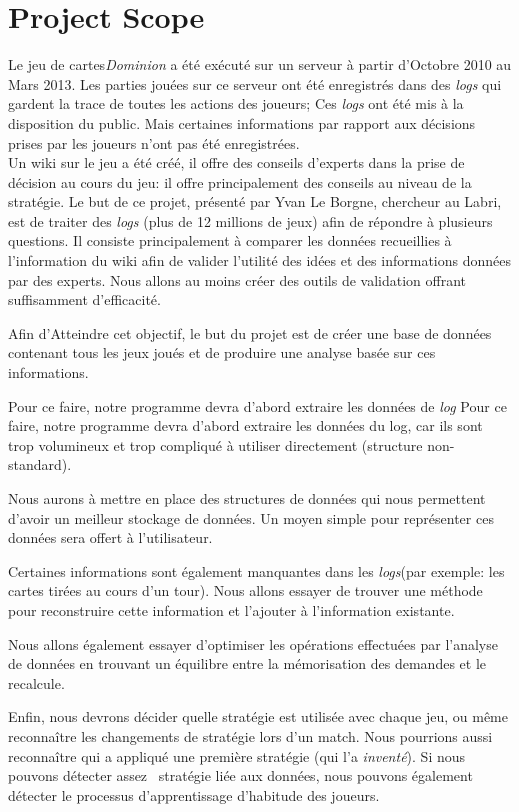 \documentclass{scrreprt}
\begin{document}
\section{Project Scope}
  Le jeu de cartes\textit{Dominion} a été exécuté sur un serveur à partir d'Octobre 2010 au Mars 2013. Les parties jouées sur ce serveur ont été enregistrés dans des \textit{logs} qui gardent la trace de toutes les actions des joueurs; Ces \textit{logs} ont été mis à la disposition du public. Mais certaines informations par rapport aux décisions prises par les joueurs n’ont pas été enregistrées.\\
 Un wiki sur le jeu a été créé, il offre des conseils d'experts dans la prise de décision au cours du jeu: il offre principalement des conseils au niveau de la stratégie. Le but de ce projet, présenté par Yvan Le Borgne, chercheur au Labri, est de traiter des \textit{logs} (plus de 12 millions de jeux) afin de répondre à plusieurs questions. Il consiste principalement à comparer les données recueillies à l'information du wiki afin de valider l'utilité des idées et des informations données par des experts. Nous allons au moins créer des outils de validation offrant suffisamment d'efficacité.
  
Afin d'Atteindre cet objectif, le but du projet est de créer une base de données contenant tous les jeux joués et de produire une analyse basée sur ces informations.

  Pour ce faire, notre programme devra d'abord extraire les données de  \textit{log} Pour ce faire, notre programme devra d'abord extraire les données du log, car ils sont trop volumineux et trop compliqué à utiliser directement (structure non-standard).

 Nous aurons à mettre en place des structures de données qui nous permettent d'avoir un meilleur stockage de données. Un moyen simple pour représenter ces données sera offert à l'utilisateur.

  Certaines informations sont également manquantes dans les \textit{logs}(par exemple: les cartes tirées au cours d'un tour). Nous allons essayer de trouver une méthode pour reconstruire cette information et l'ajouter à l'information existante.

  Nous allons également essayer d'optimiser les opérations effectuées par l'analyse de données en trouvant un équilibre entre la mémorisation des demandes et le recalcule.

  Enfin, nous devrons décider quelle stratégie est utilisée avec chaque jeu, ou même reconnaître les changements de stratégie lors d'un match. Nous pourrions aussi reconnaître qui a appliqué une première stratégie (qui l'a \textit{inventé}). Si nous pouvons détecter assez  stratégie liée aux données, nous pouvons également détecter le processus d'apprentissage d'habitude des joueurs.
\end{document}
